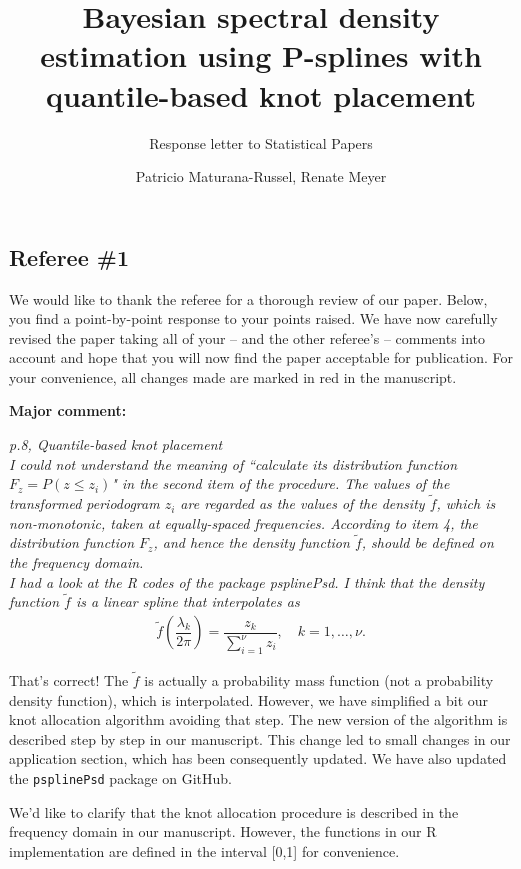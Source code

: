 \documentclass{scrartcl}
\title{Bayesian spectral density estimation using P-splines with quantile-based knot placement}
\subtitle{Response letter to Statistical Papers}
\author{Patricio Maturana-Russel, Renate Meyer}
\newcommand{\refereeQuote}{\textit }
\newcommand{\response}{}
\begin{document}
\maketitle\thispagestyle{empty}




\subsection*{Referee \#1}

\response{We would like to thank the referee for a thorough review of our paper. Below, you find a point-by-point response to your points raised. We have now carefully revised the paper taking all of your -- and the other referee's -- comments into account and hope that you will now find the paper acceptable for publication. For your convenience, all changes made are marked in red in the manuscript.} 

\textbf{Major comment:}

\refereeQuote{p.8, Quantile-based knot placement\\
I could not understand the meaning of ``calculate its distribution function $F_z = P(z \leq z_i)$" in the second item of the procedure.  The values of the transformed periodogram $z_i$ are regarded as the values of the density $\tilde{f}$, which is non-monotonic, taken at equally-spaced frequencies.  According to item 4, the distribution function $F_z$, and hence the density function $\tilde{f}$, should be defined on the frequency domain. \\
I had a look at the R codes of the package psplinePsd. I think that the density function $\tilde{f}$ is a linear spline that interpolates as
\begin{align*}
\tilde{f} \left(\dfrac{\lambda_k}{2\pi}\right) = \dfrac{z_k}{\sum_{i=1}^{\nu}z_i}, \quad k=1,\dots,\nu.
\end{align*}
}

\response{That's correct!  The $\widetilde{f}$ is actually a probability mass function (not a probability density function), which is interpolated.  However, we have simplified a bit our knot allocation algorithm avoiding that step.  The new version of the algorithm is described step by step in our manuscript.  This change led to small changes in our application section, which has been consequently updated.  We have also updated the \texttt{psplinePsd} package on GitHub.

We'd like to clarify that the knot allocation procedure is described in the frequency domain in our manuscript.  However, the functions in our R implementation are defined in the interval [0,1] for convenience.
}\bigskip 
\end{document}
